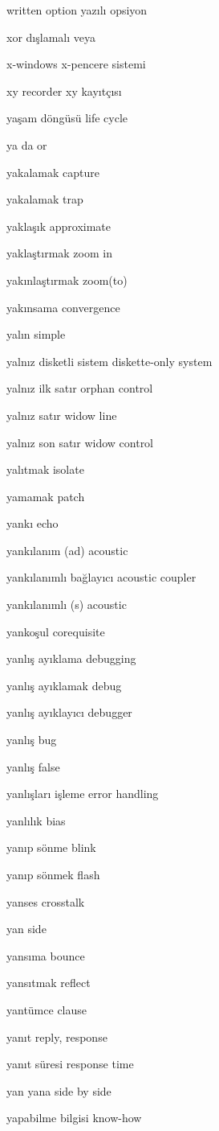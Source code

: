 \documentclass[12pt,fleqn]{article}\usepackage{../../common}
\begin{document}
written option yazılı opsiyon

xor dışlamalı veya

x-windows x-pencere sistemi

xy recorder xy kayıtçısı

yaşam döngüsü life cycle

ya da or

yakalamak capture

yakalamak trap

yaklaşık approximate

yaklaştırmak zoom in

yakınlaştırmak zoom(to)

yakınsama convergence

yalın simple

yalnız disketli sistem diskette-only system

yalnız ilk satır orphan control

yalnız satır widow line

yalnız son satır widow control

yalıtmak isolate

yamamak patch

yankı echo

yankılanım (ad) acoustic

yankılanımlı bağlayıcı acoustic coupler

yankılanımlı (s) acoustic

yankoşul corequisite

yanlış ayıklama debugging

yanlış ayıklamak debug

yanlış ayıklayıcı debugger

yanlış bug

yanlış false

yanlışları işleme error handling

yanlılık bias

yanıp sönme blink

yanıp sönmek flash

yanses crosstalk

yan side

yansıma bounce

yansıtmak reflect

yantümce clause

yanıt reply, response

yanıt süresi response time

yan yana side by side

yapabilme bilgisi know-how
\end{document}
